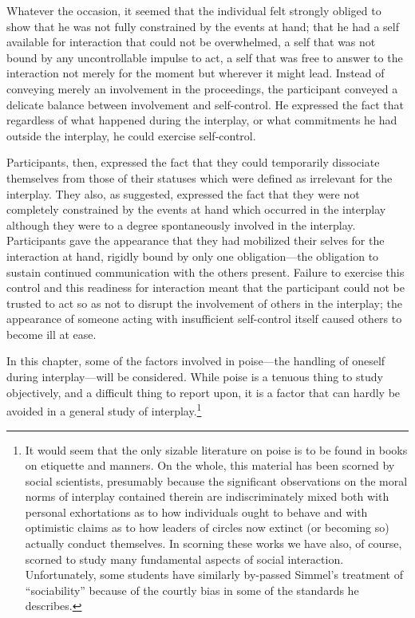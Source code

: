 \documentclass[openany,nobib]{tufte-book}
\begin{document}
Whatever the occasion, it seemed that the individual felt strongly
obliged to show that he was not fully constrained by the events at hand;
that he had a self available for interaction that could not be
overwhelmed, a self that was not bound by any uncontrollable impulse to
act, a self that was free to answer to the interaction not merely for
the moment but wherever it might lead. Instead of conveying merely an
involvement in the proceedings, the participant conveyed a delicate
balance between involvement and self-control. He expressed the fact that
regardless of what happened during the interplay, or what commitments he
had outside the interplay, he could exercise self-control.

Participants, then, expressed the fact that they could temporarily
dissociate themselves from those of their statuses which were defined as
irrelevant for the interplay. They also, as suggested, expressed the
fact that they were not completely constrained by the events at hand
which occurred in the interplay although they were to a degree
spontaneously involved in the interplay. Participants gave the
appearance that they had mobilized their selves for the interaction at
hand, rigidly bound by only one obligation---the obligation to sustain
continued communication with the others present. Failure to exercise
this control and this readiness for interaction meant that the
participant could not be trusted to act so as not to disrupt the
involvement of others in the interplay; the appearance of someone acting
with insufficient self-control itself caused others to become ill at
ease.

In this chapter, some of the factors involved in poise---the handling of
oneself during interplay---will be considered. While poise is a tenuous
thing to study objectively, and a difficult thing to report upon, it is
a factor that can hardly be avoided in a general study of
interplay.\footnote{It would seem that the only sizable literature on
  poise is to be found in books on etiquette and manners. On the whole,
  this material has been scorned by social scientists, presumably
  because the significant observations on the moral norms of interplay
  contained therein are indiscriminately mixed both with personal
  exhortations as to how individuals ought to behave and with optimistic
  claims as to how leaders of circles now extinct (or becoming so)
  actually conduct themselves. In scorning these works we have also, of
  course, scorned to study many fundamental aspects of social
  interaction. Unfortunately, some students have similarly by-passed
  Simmel's treatment of ``sociability'' because of the courtly bias in
  some of the standards he describes.}
\end{document}

